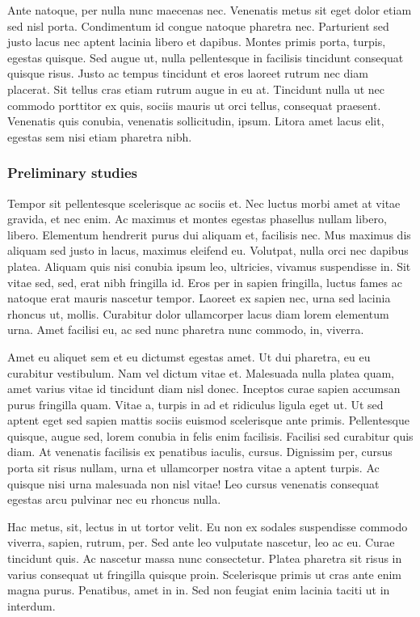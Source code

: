\documentclass[11pt,]{article}
\begin{document}
Ante natoque, per nulla nunc maecenas nec. Venenatis metus sit eget
dolor etiam sed nisl porta. Condimentum id congue natoque pharetra nec.
Parturient sed justo lacus nec aptent lacinia libero et dapibus. Montes
primis porta, turpis, egestas quisque. Sed augue ut, nulla pellentesque
in facilisis tincidunt consequat quisque risus. Justo ac tempus
tincidunt et eros laoreet rutrum nec diam placerat. Sit tellus cras
etiam rutrum augue in eu at. Tincidunt nulla ut nec commodo porttitor ex
quis, sociis mauris ut orci tellus, consequat praesent. Venenatis quis
conubia, venenatis sollicitudin, ipsum. Litora amet lacus elit, egestas
sem nisi etiam pharetra nibh.

\hypertarget{preliminary-studies}{%
\subsubsection{Preliminary studies}\label{preliminary-studies}}

Tempor sit pellentesque scelerisque ac sociis et. Nec luctus morbi amet
at vitae gravida, et nec enim. Ac maximus et montes egestas phasellus
nullam libero, libero. Elementum hendrerit purus dui aliquam et,
facilisis nec. Mus maximus dis aliquam sed justo in lacus, maximus
eleifend eu. Volutpat, nulla orci nec dapibus platea. Aliquam quis nisi
conubia ipsum leo, ultricies, vivamus suspendisse in. Sit vitae sed,
sed, erat nibh fringilla id. Eros per in sapien fringilla, luctus fames
ac natoque erat mauris nascetur tempor. Laoreet ex sapien nec, urna sed
lacinia rhoncus ut, mollis. Curabitur dolor ullamcorper lacus diam lorem
elementum urna. Amet facilisi eu, ac sed nunc pharetra nunc commodo, in,
viverra.

Amet eu aliquet sem et eu dictumst egestas amet. Ut dui pharetra, eu eu
curabitur vestibulum. Nam vel dictum vitae et. Malesuada nulla platea
quam, amet varius vitae id tincidunt diam nisl donec. Inceptos curae
sapien accumsan purus fringilla quam. Vitae a, turpis in ad et ridiculus
ligula eget ut. Ut sed aptent eget sed sapien mattis sociis euismod
scelerisque ante primis. Pellentesque quisque, augue sed, lorem conubia
in felis enim facilisis. Facilisi sed curabitur quis diam. At venenatis
facilisis ex penatibus iaculis, cursus. Dignissim per, cursus porta sit
risus nullam, urna et ullamcorper nostra vitae a aptent turpis. Ac
quisque nisi urna malesuada non nisl vitae! Leo cursus venenatis
consequat egestas arcu pulvinar nec eu rhoncus nulla.

Hac metus, sit, lectus in ut tortor velit. Eu non ex sodales suspendisse
commodo viverra, sapien, rutrum, per. Sed ante leo vulputate nascetur,
leo ac eu. Curae tincidunt quis. Ac nascetur massa nunc consectetur.
Platea pharetra sit risus in varius consequat ut fringilla quisque
proin. Scelerisque primis ut cras ante enim magna purus. Penatibus, amet
in in. Sed non feugiat enim lacinia taciti ut in interdum.
\end{document}
